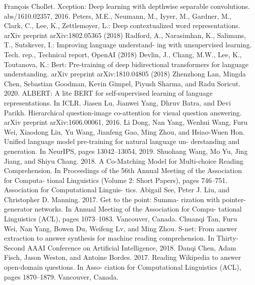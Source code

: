 \documentclass{article}
\begin{document}
\begin{thebibliography}{99}
    François Chollet. Xception: Deep learning with depthwise separable convolutions.
    abs/1610.02357, 2016.
    Peters, M.E., Neumann, M., Iyyer, M., Gardner, M., Clark, C., Lee, K., Zettlemoyer, L.:
    Deep contextualized word representations. arXiv preprint arXiv:1802.05365 (2018)
    Radford, A., Narasimhan, K., Salimans, T., Sutskever, I.: Improving language understand-
    ing with unsupervised learning. Tech. rep., Technical report, OpenAI (2018)
    Devlin, J., Chang, M.W., Lee, K., Toutanova, K.: Bert: Pre-training of deep bidirectional
    transformers for language understanding. arXiv preprint arXiv:1810.04805 (2018)
    Zhenzhong Lan, Mingda Chen, Sebastian Goodman,
    Kevin Gimpel, Piyush Sharma, and Radu Soricut.
    2020. ALBERT: A lite BERT for self-supervised
    learning of language representations. In ICLR.
    Jiasen Lu, Jianwei Yang, Dhruv Batra, and Devi Parikh. Hierarchical question-image co-attention
    for visual question answering. arXiv preprint arXiv:1606.00061, 2016.
    Li Dong, Nan Yang, Wenhui Wang, Furu Wei, Xiaodong Liu,
    Yu Wang, Jianfeng Gao, Ming Zhou, and Hsiao-Wuen Hon.
    Unified language model pre-training for natural language un-
    derstanding and generation. In NeurIPS, pages 13042–13054,
    2019.
    Shuohang Wang, Mo Yu, Jing Jiang, and Shiyu Chang.
    2018. A Co-Matching Model for Multi-choice
    Reading Comprehension. In Proceedings of the 56th
    Annual Meeting of the Association for Computa-
    tional Linguistics (Volume 2: Short Papers), pages
    746–751. Association for Computational Linguis-
    tics.
    Abigail See, Peter J. Liu, and Christopher D.
    Manning. 2017. Get to the point: Summa-
    rization with pointer-generator networks. In
    Annual Meeting of the Association for Compu-
    tational Linguistics (ACL), pages 1073–1083.
    Vancouver, Canada.
    Chuanqi Tan, Furu Wei, Nan Yang, Bowen Du, Weifeng Lv, and Ming Zhou. S-net: From
    answer extraction to answer synthesis for machine reading comprehension. In Thirty-Second
    AAAI Conference on Artificial Intelligence, 2018.
    Danqi Chen, Adam Fisch, Jason Weston, and
    Antoine Bordes. 2017. Reading Wikipedia
    to answer open-domain questions. In Asso-
    ciation for Computational Linguistics (ACL),
    pages 1870–1879. Vancouver, Canada.

















\end{thebibliography}
\end{document}

